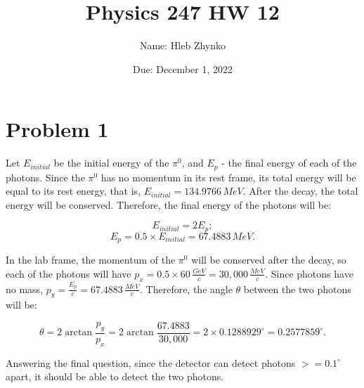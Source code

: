 \documentclass{article}
\title{Physics 247 HW 12}
\author{Name: Hleb Zhynko}
\date{Due: December 1, 2022}
\begin{document}
\maketitle

\section*{Problem 1}
Let $E_{initial}$ be the initial energy of the $\pi^0$, and $E_p$ - the final energy of each of the photons. Since the $\pi^0$ has no momentum in its rest frame, its total energy will be equal to its rest energy, that is, $E_{initial} = 134.9766\,MeV$. After the decay, the total energy will be conserved. Therefore, the final energy of the photons will be:

\[
E_{initial} = 2E_p;
\]
\[
E_p = 0.5 \times E_{initial} = 67.4883\,MeV.
\]

In the lab frame, the momentum of the $\pi^0$ will be conserved after the decay, so each of the photons will have $p_x = 0.5 \times 60\,\frac{GeV}{c} = 30,000\,\frac{MeV}{c}$. Since photons have no mass, $p_y = \frac{E_p}{c} = 67.4883\,\frac{MeV}{c}$. Therefore, the angle $\theta$ between the two photons will be:

\[
\theta =2\arctan{\frac{p_y}{p_x}} = 2\arctan{\frac{67.4883}{30,000}} = 2 \times 0.1288929^{\circ} = 0.2577859^{\circ}.
\]

Answering the final question, since the detector can detect photons $>= 0.1^{\circ}$ apart, it should be able to detect the two photons.
\end{document}
